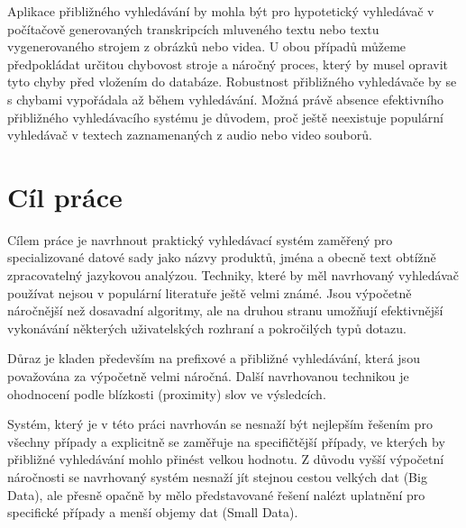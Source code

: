 \documentclass[11pt,letterpaper,oneside,openright]{book}
\begin{document}
Aplikace přibližného vyhledávání by mohla být pro hypotetický vyhledávač v
počítačově generovaných transkripcích mluveného textu nebo textu vygenerovaného
strojem z obrázků nebo videa. U obou případů můžeme předpokládat určitou
chybovost stroje a náročný proces, který by musel opravit tyto chyby před
vložením do databáze. Robustnost přibližného vyhledávače by se s chybami
vypořádala až během vyhledávání. Možná právě absence efektivního přibližného
vyhledávacího systému je důvodem, proč ještě neexistuje populární vyhledávač v
textech zaznamenaných z audio nebo video souborů.



\section{Cíl práce}
Cílem práce je navrhnout praktický vyhledávací systém zaměřený pro
specializované datové sady jako názvy produktů, jména a obecně text obtížně
zpracovatelný jazykovou analýzou. Techniky, které by měl navrhovaný vyhledávač
používat nejsou v populární literatuře ještě velmi známé. Jsou výpočetně
náročnější než dosavadní algoritmy, ale na druhou stranu umožňují efektivnější
vykonávání některých uživatelských rozhraní a pokročilých typů dotazu.


Důraz je kladen především na prefixové a přibližné vyhledávání, která jsou
považována za výpočetně velmi náročná. Další navrhovanou technikou je
ohodnocení podle blízkosti (proximity) slov ve výsledcích.

Systém, který je v této práci navrhován se nesnaží být nejlepším řešením pro
všechny případy a explicitně se zaměřuje na specifičtější případy, ve kterých
by přibližné vyhledávání mohlo přinést velkou hodnotu. Z důvodu vyšší výpočetní
náročnosti se navrhovaný systém nesnaží jít stejnou cestou velkých dat (Big
Data), ale přesně opačně by mělo představované řešení nalézt uplatnění pro
specifické případy a menší objemy dat (Small Data).
\end{document}
